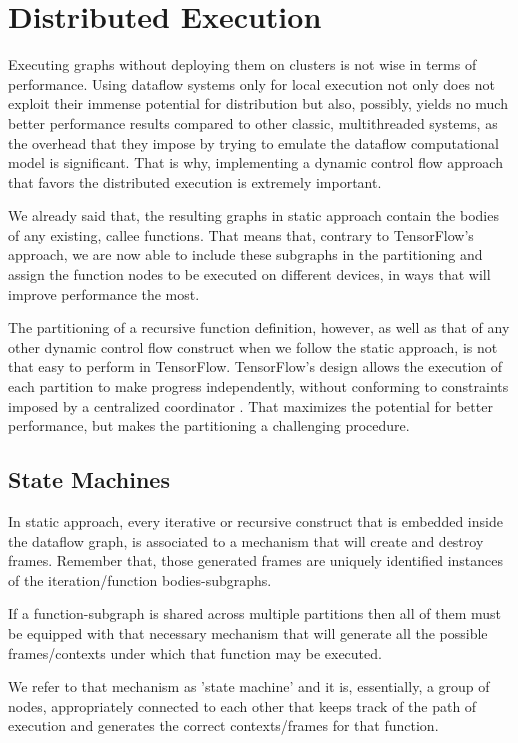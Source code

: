 \documentclass[ack,preface]{dithesis}
\begin{document}
    \section{Distributed Execution}

Executing graphs without deploying them on clusters is not wise in terms of performance.  Using dataflow systems only for local execution not only does not exploit their immense potential  for distribution but also, possibly, yields no much better performance results compared to other classic, multithreaded systems, as the overhead that they impose by trying to emulate the dataflow computational model is significant. 
That is why, implementing a dynamic control flow approach that favors the distributed execution is extremely important. 

We already said that, the resulting graphs in static approach contain the bodies of any existing, callee functions. That means that, contrary to TensorFlow's approach, we are now able to include these subgraphs in the partitioning and assign the function nodes to be executed on different devices, in ways that will improve performance the most.

The partitioning of a recursive function definition, however, as well as that of any other dynamic control flow construct  when we follow the static approach, is not that easy to perform in TensorFlow.
TensorFlow's design allows the execution of each partition to make progress independently, without conforming to constraints imposed by a centralized coordinator \cite{Yu:2018}. That maximizes the potential for better performance, but makes the partitioning a challenging procedure.


    \subsection{State Machines}

In static approach, every iterative or recursive construct that is embedded inside the dataflow graph, is associated to a mechanism that will create and destroy frames.
Remember that, those generated frames are uniquely identified instances of the iteration/function bodies-subgraphs.

If a function-subgraph is shared across multiple partitions then all of them must be equipped with that necessary mechanism that will generate all the possible frames/contexts under which that function may be executed. 

We refer to that mechanism as 'state machine' and it is, essentially, a group of nodes, appropriately connected to each other that keeps track of the path of execution and generates the correct contexts/frames for that function. 
\end{document}
